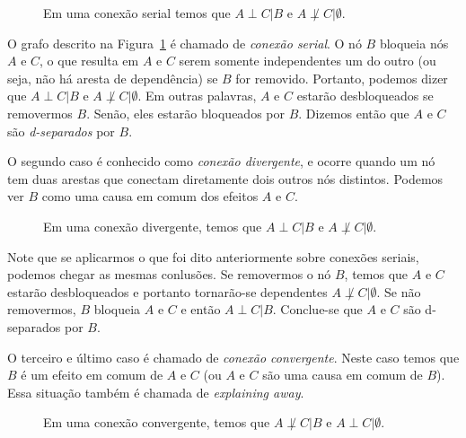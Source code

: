 \documentclass{amsart}
\theoremstyle{plain}
\numberwithin{equation}{subsection}
\begin{document}
\begin{figure}[h]
  \caption{Em uma conexão serial temos que $A\perp C|B$ e $A\not\perp C|\emptyset$.}\label{serial-connection}
\end{figure}

O grafo descrito na Figura~\ref{serial-connection} é chamado de \textit{conexão serial}. O nó $B$
bloqueia nós $A$ e $C$, o que resulta em $A$ e $C$ serem somente independentes um do outro (ou
seja, não há aresta de dependência) se $B$ for removido. Portanto, podemos dizer que $A\perp C|B$ e
$A\not\perp C|\emptyset$. Em outras palavras, $A$ e $C$ estarão desbloqueados se removermos $B$.
Senão, eles estarão bloqueados por $B$.  Dizemos então que $A$ e $C$ são \textit{d-separados} por
$B$.

O segundo caso é conhecido como \textit{conexão divergente}, e ocorre quando um nó tem duas arestas
que conectam diretamente dois outros nós distintos. Podemos ver $B$ como uma causa em comum dos
efeitos $A$ e $C$.

\begin{figure}[h]
  \caption{Em uma conexão divergente, temos que $A\perp C|B$ e $A\not\perp C|\emptyset$.}\label{divergent-connection}
\end{figure}

Note que se aplicarmos o que foi dito anteriormente sobre conexões seriais, podemos chegar as
mesmas conlusões. Se removermos o nó $B$, temos que $A$ e $C$ estarão desbloqueados e portanto
tornarão-se dependentes $A\not\perp C|\emptyset$. Se não removermos, $B$ bloqueia $A$ e $C$ e
então $A\perp C|B$. Conclue-se que $A$ e $C$ são d-separados por $B$.

O terceiro e último caso é chamado de \textit{conexão convergente}. Neste caso temos que $B$ é um
efeito em comum de $A$ e $C$ (ou $A$ e $C$ são uma causa em comum de $B$). Essa situação também é
chamada de \textit{explaining away}.

\begin{figure}[h]
  \caption{Em uma conexão convergente, temos que $A\not\perp C|B$ e $A\perp C|\emptyset$.}\label{convergent-connection}
\end{figure}
\end{document}

